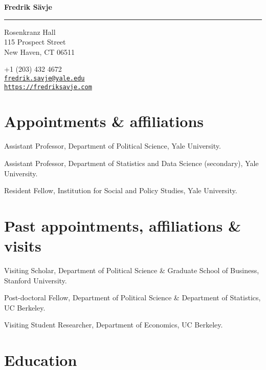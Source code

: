 \documentclass[10pt,letterpaper]{article}
\newenvironment{datelist}{
	\begin{list}{}{
		\setlength{\parskip}{0pt}
		\setlength{\itemsep}{4pt}
		\setlength{\parsep}{0.3em}
		\setlength{\leftmargin}{5.85em}
		\setlength{\labelwidth}{5.85em}
		\setlength{\labelsep}{1.5em}
		}
	}{
\end{list}
}
\newcommand{\dateitem}[2][]{\item[{#1}] {#2}}
\newenvironment{infolist}{
	\begin{list}{}{
		\setlength{\parskip}{0pt}
		\setlength{\itemsep}{4pt}
		\setlength{\parsep}{0.3em}
		\setlength{\leftmargin}{0em}
		\setlength{\labelwidth}{0em}
		}
	}{
\end{list}
}
\newcommand{\infoitem}[1]{\item {#1}}
\begin{document}
	{\huge \bf Fredrik Sävje}

	\rule{\textwidth}{1pt}

	\bigskip


	\begin{minipage}[t]{0.495\textwidth}
		Rosenkranz Hall \\
		115 Prospect Street \\
		New Haven, CT 06511
	\end{minipage}
	\begin{minipage}[t]{0.495\textwidth}
		+1 (203) 432 4672 \\
		\href{mailto:fredrik.savje@yale.edu}{\texttt{fredrik.savje@yale.edu}} \\
		\href{https://fredriksavje.com}{\texttt{https://fredriksavje.com}}
	\end{minipage}

	\vspace{0.3in}


	\section*{Appointments \& affiliations}

	\begin{infolist}
		\infoitem{Assistant Professor, Department of Political Science, Yale University.}
		\infoitem{Assistant Professor, Department of Statistics and Data Science (secondary), Yale University.}
		\infoitem{Resident Fellow, Institution for Social and Policy Studies, Yale University.}
	\end{infolist}


	\section*{Past appointments, affiliations \& visits}

	\begin{datelist}
		\dateitem[2019--2020]{Visiting Scholar, Department of Political Science \& Graduate School of Business, Stanford University.}
		\dateitem[2015--2017]{Post-doctoral Fellow, Department of Political Science \& Department of Statistics, UC Berkeley.}
		\dateitem[2013--2014]{Visiting Student Researcher, Department of Economics, UC Berkeley.}
	\end{datelist}


	\section*{Education}
\end{document}
